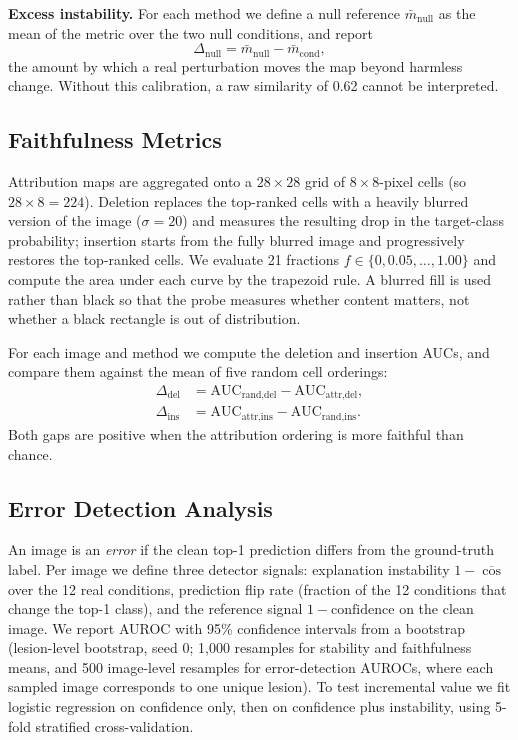 \documentclass[conference]{IEEEtran}
\begin{document}
\textbf{Excess instability.} For each method we define a null reference
$\bar{m}_{\text{null}}$ as the mean of the metric over the two null
conditions, and report
\begin{equation}
\Delta_{\text{null}} = \bar{m}_{\text{null}} - \bar{m}_{\text{cond}},
\end{equation}
the amount by which a real perturbation moves the map beyond harmless
change. Without this calibration, a raw similarity of 0.62 cannot be
interpreted.

\subsection{Faithfulness Metrics}
Attribution maps are aggregated onto a $28\times28$ grid of $8\times8$-pixel
cells (so $28\times8=224$). Deletion replaces the top-ranked cells with a
heavily blurred version of the image ($\sigma{=}20$) and measures the
resulting drop in the target-class probability; insertion starts from the
fully blurred image and progressively restores the top-ranked cells. We evaluate
21 fractions $f\in\{0,0.05,\dots,1.00\}$ and compute the area under each
curve by the trapezoid rule. A blurred fill is used rather than black so
that the probe measures whether content matters, not whether a black
rectangle is out of distribution.

For each image and method we compute the deletion and insertion AUCs, and
compare them against the mean of five random cell orderings:
\begin{align}
\Delta_{\text{del}} &= \mathrm{AUC}_{\text{rand,del}} -
\mathrm{AUC}_{\text{attr,del}},\\
\Delta_{\text{ins}} &= \mathrm{AUC}_{\text{attr,ins}} -
\mathrm{AUC}_{\text{rand,ins}}.
\end{align}
Both gaps are positive when the attribution ordering is more faithful than
chance.

\subsection{Error Detection Analysis}
An image is an \emph{error} if the clean top-1 prediction differs from the
ground-truth label. Per image we define three detector signals: explanation
instability $1-\overline{\cos}$ over the 12 real conditions, prediction flip
rate (fraction of the 12 conditions that change the top-1 class), and the
reference signal $1-\text{confidence}$ on the clean image. We report AUROC
with 95\% confidence intervals from a bootstrap (lesion-level bootstrap,
seed 0; 1{,}000 resamples for stability and faithfulness means, and 500
image-level resamples for error-detection AUROCs, where each sampled image
corresponds to one unique lesion). To test incremental value we fit logistic regression
on confidence only, then on confidence plus instability, using 5-fold
stratified cross-validation.
\end{document}
